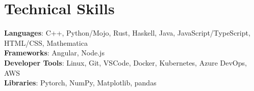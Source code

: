 \documentclass[letterpaper,11pt]{article}
\begin{document}
\section{Technical Skills}
 \begin{itemize}[leftmargin=0.15in, label={}]
    \small{\item{
      \textbf{Languages}{: C++, Python/Mojo, Rust, Haskell, Java, JavaScript/TypeScript, HTML/CSS, Mathematica} \\
      \textbf{Frameworks}{: Angular, Node.js} \\
      \textbf{Developer Tools}{: Linux, Git, VSCode, Docker, Kubernetes, Azure DevOps, AWS} \\
      \textbf{Libraries}{: Pytorch, NumPy, Matplotlib, pandas}
    }}
 \end{itemize}


\end{document}
